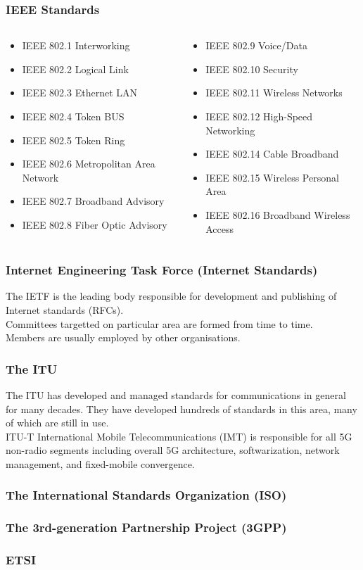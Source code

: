 \documentclass[18pt]{beamer}
\begin{document}
\begin{frame}\LARGE
\frametitle{IEEE Standards}
\begin{columns}
\begin{column}{0.480\textwidth}
\begin{itemize}\large
\item IEEE 802.1 Interworking
\item IEEE 802.2 Logical Link
\item IEEE 802.3 Ethernet LAN
\item IEEE 802.4 Token BUS
\item IEEE 802.5 Token Ring
\item IEEE 802.6 Metropolitan Area Network
\item IEEE 802.7 Broadband Advisory
\item IEEE 802.8 Fiber Optic Advisory
\end{itemize}
\end{column}
\begin{column}{0.460\textwidth}
\begin{itemize}\large
\item IEEE 802.9 Voice/Data
\item IEEE 802.10 Security 
\item IEEE 802.11 Wireless Networks
\item IEEE 802.12 High-Speed Networking
\item IEEE 802.14 Cable Broadband
\item IEEE 802.15 Wireless Personal Area
\item IEEE 802.16 Broadband Wireless Access
\end{itemize}
\end{column}
\end{columns}
\end{frame}

\begin{frame}\LARGE
\frametitle{Internet Engineering Task Force (Internet Standards)}
The IETF is the leading body responsible for development and publishing of
Internet standards (RFCs). \\[2mm]
%
Committees targetted on particular area are formed from time to time.\\[2mm]
%
Members are usually employed by other organisations.\\
\end{frame}

\begin{frame}\LARGE
\frametitle{The ITU}
\large
The ITU has developed and managed standards for communications in general
for many decades. They have developed hundreds of standards in this area, many
of which are still in use.\\[2mm]
%
ITU-T International Mobile Telecommunications (IMT) is responsible for all 5G non-radio
segments including overall 5G architecture, softwarization,
network management, and fixed-mobile convergence.
\end{frame}

\begin{frame}\LARGE
\frametitle{The International Standards Organization (ISO)}
\end{frame}

\begin{frame}\LARGE
\frametitle{The 3rd-generation Partnership Project (3GPP)}
\end{frame}

\begin{frame}\LARGE
\frametitle{ETSI}
\end{frame}
\end{document}
